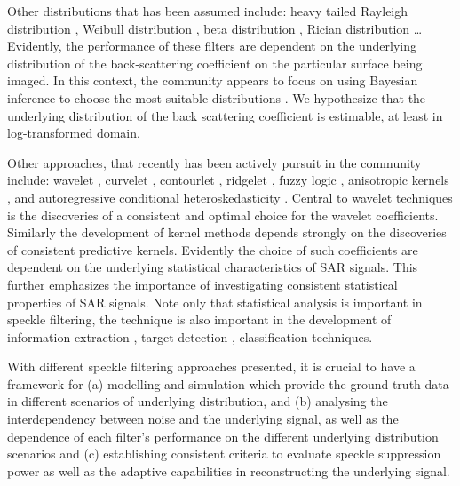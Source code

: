 Other distributions that has been assumed include: heavy tailed Rayleigh distribution \cite{Sun_2006_ICVES}, Weibull distribution \cite{Nezry_1997_IGARSS}, beta distribution \cite{Nezry_1997_IGARSS}, Rician distribution \cite{Lewinski_1983_TAntennaPropagation} \dots 
Evidently, the performance of these filters are dependent on the underlying distribution of the back-scattering coefficient on the particular surface being imaged. 
In this context, the community appears to focus on using Bayesian inference to choose the most suitable distributions \cite{Walessa_2000_TGRS}.
We hypothesize that the underlying distribution of the back scattering coefficient is estimable, at least in log-transformed domain.

Other approaches, that recently has been actively pursuit in the community include: 
	wavelet \cite{Gagnon_SPIEProc_1997, VidalPantaleoni_2004_IJRS, Moulin_1993_JMathImageVision, Hervet_1998_SPIE, Hebar_2009_TGRS, Chen_2007_IET, Bianchi_TGRS_2008, Argenti_2006_TGRS}, 
	curvelet \cite{Wang_2007_ICWAPR, Saevarsson_2003_IGARSS, Guo_2008_ICARCV}, 
	contourlet \cite{Foucher_2006_IGARSS}, 
	ridgelet \cite{Saevarsson_2004_IGARSS},
	fuzzy logic \cite{Cheng_ETCS_2009}, 
	anisotropic kernels \cite{DHondt_2006_TGRS}, 
	and autoregressive conditional heteroskedasticity \cite{Amirmazlaghani_2009_DSPWorkshop}. %
Central to wavelet techniques is the discoveries of a consistent and optimal choice for the wavelet coefficients.
Similarly the development of kernel methods depends strongly on the discoveries of consistent predictive kernels.
Evidently the choice of such coefficients are dependent on the underlying statistical characteristics of SAR signals.
This further emphasizes the importance of investigating consistent statistical properties of SAR signals.
Note only that statistical analysis is important in speckle filtering, the technique is also important in the development of information extraction \cite{Oliver_1991_JPhysDApplPhys}, target detection \cite{Luttrell_1986_JPhysDApplPhys}, classification \cite{Nyoungui_2002_IntlJRemoteSense} techniques. 

With different speckle filtering approaches presented, it is crucial to have a framework for 
	(a) modelling and simulation which provide the ground-truth data in different scenarios of underlying distribution, and
	(b) analysing the interdependency between noise and the underlying signal, as well as the dependence of each filter's performance on the different underlying distribution scenarios and
	(c) establishing consistent criteria to evaluate speckle suppression power as well as the adaptive capabilities in reconstructing the underlying signal.


